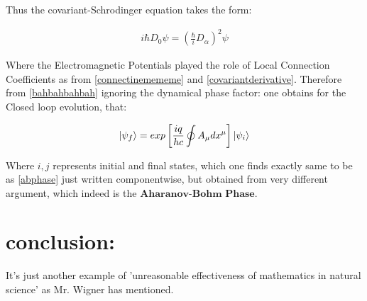 \documentclass[8pt, twocoloumn]{article}
\begin{document}
Thus the covariant-Schrodinger equation takes the form:

\begin{align}
    i\hbar D_0 \psi = {(\frac{\hbar}{i} D_{\alpha})}^{2}\psi
\end{align}

Where the Electromagnetic Potentials played the role of Local Connection Coefficients as from \ref{connectinemememe} and \ref{covariantderivative}. Therefore from \ref{bahbahbahbah} ignoring the dynamical phase factor: one obtains for the Closed loop evolution, that:


\begin{align}
    \ket{\psi_f} = exp \left[ \frac{iq}{hc} \oint A_{\mu}dx^{\mu} \right] \ket{\psi_i}
\end{align}

Where $i, j$ represents initial and final states, which one finds exactly same to be as \ref{abphase} just written componentwise, but obtained from very different argument, which indeed is the $\textbf{Aharanov-Bohm Phase}$.


    


\section{conclusion:}

It's just another example of 'unreasonable effectiveness of mathematics in natural science' as Mr. Wigner has mentioned.



\end{document}
